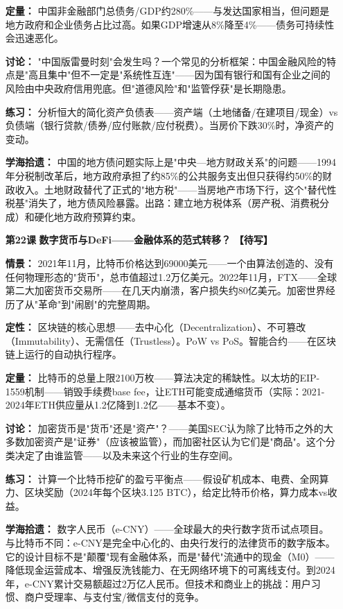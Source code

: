 \documentclass[a4paper,11pt]{ctexart}
\newcommand{\draft}{\textcolor{orange!80!black}{\textbf{【待写】}}}
\begin{document}
\begin{enumerate}
\textbf{定量：} 中国非金融部门总债务/GDP约280\%——与发达国家相当，但问题是地方政府和企业债务占比过高。如果GDP增速从8\%降至4\%——债务可持续性会迅速恶化。

\textbf{讨论：} "中国版雷曼时刻"会发生吗？一个常见的分析框架：中国金融风险的特点是"高且集中"但不一定是"系统性互连"——因为国有银行和国有企业之间的风险由中央政府信用兜底。但"道德风险"和"监管俘获"是长期隐患。

\textbf{练习：} 分析恒大的简化资产负债表——资产端（土地储备/在建项目/现金）vs 负债端（银行贷款/债券/应付账款/应付税费）。当房价下跌30\%时，净资产的变动。

\textbf{学海拾遗：} 中国的地方债问题实际上是"中央—地方财政关系"的问题——1994年分税制改革后，地方政府承担了约85\%的公共服务支出但只获得约50\%的财政收入。土地财政替代了正式的"地方税"——当房地产市场下行，这个"替代性税基"消失了，地方债风险暴露。出路：建立地方税体系（房产税、消费税分成）和硬化地方政府预算约束。

\item[\textbf{第22课}] \textbf{数字货币与DeFi——金融体系的范式转移？} \draft

\textbf{情景：} 2021年11月，比特币价格达到69000美元——一个由算法创造的、没有任何物理形态的"货币"，总市值超过1.2万亿美元。2022年11月，FTX——全球第二大加密货币交易所——在几天内崩溃，客户损失约80亿美元。加密世界经历了从"革命"到"闹剧"的完整周期。

\textbf{定性：} 区块链的核心思想——去中心化（Decentralization）、不可篡改（Immutability）、无需信任（Trustless）。PoW vs PoS。智能合约——在区块链上运行的自动执行程序。

\textbf{定量：} 比特币的总量上限2100万枚——算法决定的稀缺性。以太坊的EIP-1559机制——销毁手续费base fee，让ETH可能变成通缩货币（实际：2021-2024年ETH供应量从1.2亿降到1.2亿——基本不变）。

\textbf{讨论：} 加密货币是"货币"还是"资产"？——美国SEC认为除了比特币之外的大多数加密资产是"证券"（应该被监管），而加密社区认为它们是"商品"。这个分类决定了由谁监管——以及未来这个行业的生存空间。

\textbf{练习：} 计算一个比特币挖矿的盈亏平衡点——假设矿机成本、电费、全网算力、区块奖励（2024年每个区块3.125 BTC），给定比特币价格，算力成本vs收益。

\textbf{学海拾遗：} 数字人民币（e-CNY）——全球最大的央行数字货币试点项目。与比特币不同：e-CNY是完全中心化的、由央行发行的法律货币的数字版本。它的设计目标不是"颠覆"现有金融体系，而是"替代"流通中的现金（M0）——降低现金运营成本、增强反洗钱能力、在无网络环境下的可离线支付。到2024年，e-CNY累计交易额超过2万亿人民币。但技术和商业上的挑战：用户习惯、商户受理率、与支付宝/微信支付的竞争。


\end{enumerate}
\end{document}

